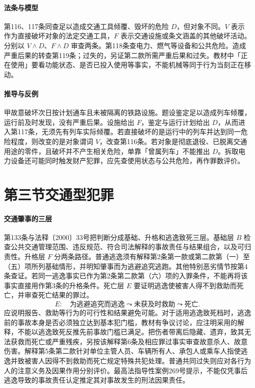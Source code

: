 \paragraph{法条与模型}
第116、117条同查足以造成交通工具倾覆、毁坏的危险 $D$，但对象不同。$V$ 表示作为直接破坏对象的法定交通工具，$F$ 表示交通设施或条文涵盖的其他破坏活动。分别以 $V\land D$、$F\land D$ 审查两条。第118条查电力、燃气等设备和公共危险。造成严重后果的转查第119条；过失的，另证第二款所需严重后果和过失。教材中「正在使用」要看功能状态、是否已投入使用等事实，不能机械等同于行为当刻正在移动。

\paragraph{推导与反例}
甲故意破坏次日按计划通车且未被隔离的铁路设施。题设鉴定足以造成列车倾覆，运行前及时发现，没有严重后果。设施给出 $F$，鉴定与运行计划给出 $D$，从而进入第117条，无须先有列车实际倾覆。若直接破坏的是运行中的列车并达到同一危险程度，则改变的是对象谓词 $V$，改查第116条。若对象是彻底退役、已脱离交通用途的零件，且破坏并不产生相关危险，单靠「曾属列车」不能推出 $D$。拆取电力设备还可能同时触发财产犯罪，应先查使用状态与公共危险，再作罪数评价。

\section{第三节\quad 交通型犯罪}

\paragraph{交通肇事的三层}
第133条与法释〔2000〕33号把判断分成基础、升格和逃逸致死三层。基础层 $B$ 检查公共交通管理范围、违反规范、符合司法解释的事故责任与结果组合，以及可归责性。升格层 $F$ 分两条路径。普通逃逸须有解释第2条第一款或第二款第（一）至（五）项所列基础情形，并明知肇事而为逃避追究逃跑。其他特别恶劣情节按第4条查证。若同一逃逸事实已作为第2条第二款第（六）项的入罪条件，不能再将该事实直接用作第3条的升格条件。死亡层 $E$ 要证明逃逸使被害人得不到救助而死亡，并审查死亡结果的罪过。
\[
 E:\quad
 \text{为逃避追究而逃逸}
 \leadsto\text{未获及时救助}
 \leadsto\text{死亡}.
\]
应说明报告、救助等行为的可行性和结果避免可能。对于适用逃逸致死档时，逃逸前的事故本身是否必须独立达到基本犯门槛，教材有争议讨论，应注明采用的解释，不能以逃逸致死反推先前事故门槛已满足。把伤者带离后隐藏、遗弃，致其无法获救而死亡或严重残疾，另按该解释第6条及相应罪过事实审查故意杀人、故意伤害。解释第5条第二款针对单位主管人员、车辆所有人、承包人或乘车人指使逃逸并致被害人因得不到救助而死亡规定特殊共犯处理。普通共同过失则应对各行为人的注意义务及因果作用分别评价。最高法指导性案例269号提示，不能仅凭事后逃逸导致的事故责任认定推定其对事故发生的刑法因果责任。

